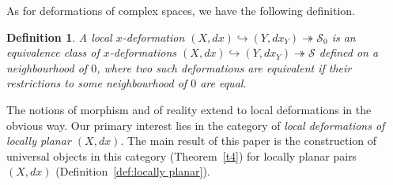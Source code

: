 \documentclass[11pt,twoside]{amsart}
\theoremstyle{plain}
\newtheorem{definition}[theorem]{Definition}
\newcommand{\Sm}{\mathcal{S}}
\newcommand{\dfx}{dx}
\begin{document}
As for deformations of complex spaces, we have the following definition.
\begin{definition}
A \emph{local $x$-deformation}  $(X,\dfx)\hookrightarrow(Y,\dfx_Y)\twoheadrightarrow\Sm_0$ is an equivalence class of $x$-deformations $(X,\dfx)\hookrightarrow(Y,\dfx_Y)\twoheadrightarrow\Sm$ defined on a neighbourhood of $0$, where two such deformations are equivalent if their restrictions to some neighbourhood of $0$ are equal.
\end{definition}

The notions of morphism and of reality extend to local deformations in the obvious way.
Our primary interest lies in the category of  \emph{local deformations of locally planar $ (X,\dfx)$}. The main result of this paper is the construction of  universal objects in this category (Theorem~\ref{t4}) for locally planar pairs $(X,\dfx)$ (Definition~\ref{def:locally planar}). 
\end{document}
